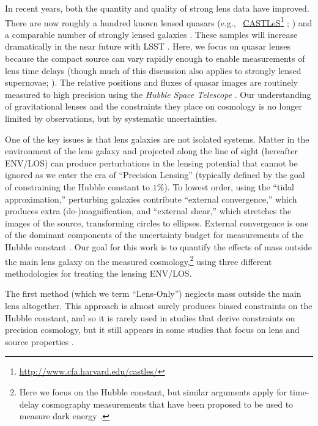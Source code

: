 \documentclass{emulateapj}
\newcommand\fnurl[2]{%
\href{#2}{#1}\footnote{\url{#2}}%
}
\begin{document}
In recent years, both the quantity and quality of strong lens data have improved. There are now roughly a hundred known lensed quasars (e.g.,\ \fnurl{CASTLeS}{http://www.cfa.harvard.edu/castles/}; \citealt{SQLS,CLASS}) and a comparable number of strongly lensed galaxies \citep[e.g.,][]{Bolton08,Cassowary}. These samples will increase dramatically in the near future with LSST \citep[e.g.,][]{LSST, Coe09, Oguri10, Collett15}. Here, we focus on quasar lenses because the compact source can vary rapidly enough to enable measurements of lens time delays (though much of this discussion also applies to strongly lensed supernovae; \citealt{Kelly15}). The relative positions and fluxes of quasar images are routinely measured to high precision using the \textit{Hubble Space Telescope} \citep[e.g,.][and references therein; CASTLeS Collaboration]{Lehar00,Sluse12}. Our understanding of gravitational lenses and the constraints they place on cosmology is no longer limited by observations, but by systematic uncertainties. 

One of the key issues is that lens galaxies are not isolated systems. Matter in the environment of the lens galaxy and projected along the line of sight (hereafter ENV/LOS) can produce perturbations in the lensing potential that cannot be ignored as we enter the era of ``Precision Lensing'' (typically defined by the goal of constraining the Hubble constant to $1\%$). To lowest order, using the ``tidal approximation,'' perturbing galaxies contribute ``external convergence,'' which produces extra (de-)magnification, and ``external shear,'' which stretches the images of the source, transforming circles to ellipses. External convergence is one of the dominant components of the uncertainty budget for measurements of the Hubble constant \citep{Suyu12}. Our goal for this work is to quantify the effects of mass outside the main lens galaxy on the measured cosmology,\footnote{Here we focus on the Hubble constant, but similar arguments apply for time-delay cosmography measurements that have been proposed to be used to measure dark energy \citep{Treu13}.} using three different methodologies for treating the lensing ENV/LOS.

The first method (which we term ``Lens-Only'') neglects mass outside the main lens altogether.  This approach is almost surely produces biased constraints on the Hubble constant, and so it is rarely used in studies that derive constraints on precision cosmology, but it still appears in some studies that focus on lens and source properties \citep[e.g.][]{Calanog14, Hezaveh13}.
\end{document}

